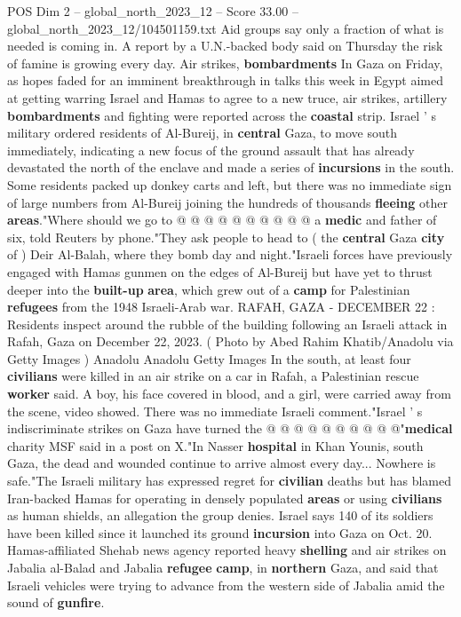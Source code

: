 \begin{textsample}{POS Dim 2 – global\_north\_2023\_12 – Score 33.00 – global\_north\_2023\_12/104501159.txt}
Aid groups say only a fraction of what is needed is coming in.
A report by a U.N.-backed body said on Thursday the risk of famine is growing every day.
Air strikes, \textbf{bombardments} In Gaza on Friday, as hopes faded for an imminent breakthrough in talks this week in Egypt aimed at getting warring Israel and Hamas to agree to a new truce, air strikes, artillery \textbf{bombardments} and fighting were reported across the \textbf{coastal} strip.
Israel ' s military ordered residents of Al-Bureij, in \textbf{central} Gaza, to move south immediately, indicating a new focus of the ground assault that has already devastated the north of the enclave and made a series of \textbf{incursions} in the south.
Some residents packed up donkey carts and left, but there was no immediate sign of large numbers from Al-Bureij joining the hundreds of thousands \textbf{fleeing} other \textbf{areas}."Where should we go to @ @ @ @ @ @ @ @ @ @ a \textbf{medic} and father of six, told Reuters by phone."They ask people to head to ( the \textbf{central} Gaza \textbf{city} of ) Deir Al-Balah, where they bomb day and night."Israeli forces have previously engaged with Hamas gunmen on the edges of Al-Bureij but have yet to thrust deeper into the \textbf{built-up} \textbf{area}, which grew out of a \textbf{camp} for Palestinian \textbf{refugees} from the 1948 Israeli-Arab war.
RAFAH, GAZA - DECEMBER 22 : Residents inspect around the rubble of the building following an Israeli attack in Rafah, Gaza on December 22, 2023. ( Photo by Abed Rahim Khatib/Anadolu via Getty Images ) Anadolu Anadolu Getty Images In the south, at least four \textbf{civilians} were killed in an air strike on a car in Rafah, a Palestinian rescue \textbf{worker} said.
A boy, his face covered in blood, and a girl, were carried away from the scene, video showed.
There was no immediate Israeli comment."Israel ' s indiscriminate strikes on Gaza have turned the @ @ @ @ @ @ @ @ @ @"\textbf{medical} charity MSF said in a post on X."In Nasser \textbf{hospital} in Khan Younis, south Gaza, the dead and wounded continue to arrive almost every day...
Nowhere is safe."The Israeli military has expressed regret for \textbf{civilian} deaths but has blamed Iran-backed Hamas for operating in densely populated \textbf{areas} or using \textbf{civilians} as human shields, an allegation the group denies.
Israel says 140 of its soldiers have been killed since it launched its ground \textbf{incursion} into Gaza on Oct. 20.
Hamas-affiliated Shehab news agency reported heavy \textbf{shelling} and air strikes on Jabalia al-Balad and Jabalia \textbf{refugee} \textbf{camp}, in \textbf{northern} Gaza, and said that Israeli vehicles were trying to advance from the western side of Jabalia amid the sound of \textbf{gunfire}.

\end{textsample}

